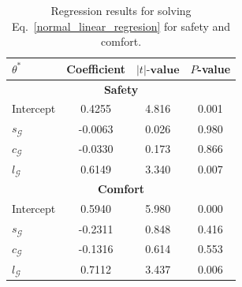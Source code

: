 \documentclass[lettersize,journal]{IEEEtran}
\begin{document}

\begin{table}[t]
\vspace{0.2cm}
\centering
\begin{tabular}{@{}lccc@{}}
\toprule
$\theta^{\ast}$ & \textbf{Coefficient} & $|t|\textbf{-value}$ & $P$\textbf{-value} \\ \midrule
\multicolumn{4}{c}{\textbf{Safety}} \\ \midrule
Intercept       & 0.4255 & 4.816 & 0.001 \\
$s_{\mathcal{G}}$ & -0.0063 & 0.026 & 0.980 \\
$c_{\mathcal{G}}$ & -0.0330 & 0.173 & 0.866 \\
$l_{\mathcal{G}}$ & 0.6149 & 3.340 & 0.007 \\ \midrule
\multicolumn{4}{c}{\textbf{Comfort}} \\ \midrule
Intercept       & 0.5940 & 5.980 & 0.000 \\
$s_{\mathcal{G}}$ & -0.2311 & 0.848 & 0.416 \\
$c_{\mathcal{G}}$ & -0.1316 & 0.614 & 0.553 \\
$l_{\mathcal{G}}$ & 0.7112 & 3.437 & 0.006 \\ \bottomrule
\end{tabular}
\caption{\footnotesize Regression results for solving Eq.~\eqref{normal_linear_regresion} for safety and comfort.}
\label{p_value_safety_comfort}
\end{table}
\end{document}
